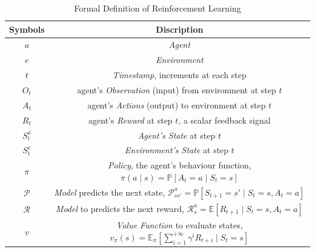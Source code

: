 \documentclass{llncs}
\begin{document}
\begin{table}[H]
\caption{Formal Definition of Reinforcement Learning\cite{David_Silver:intro_RL}}
\centering
\begin{tabular}{c c} %
\hline Symbols & Discription \\[0ex] \hline
$a$ & \emph{Agent}\\
$e$ & \emph{Environment}\\
$t$ & \emph{Timestamp}, increments at each step\\
$O_t$ & agent's \emph{Observation} (input) from environment at step $t$\\
$A_t$ & agent's \emph{Actions} (output) to environment at step $t$\\
$R_t$ & agent's \emph{Reward} at step $t$, a scalar feedback signal\\
$S_t^a$ & \emph{Agent's State} at step $t$\\
$S_t^e$ & \emph{Environment's State} at step $t$\\
$\pi$ & \emph{Policy}, the agent's behaviour function, $\pi(a \mid s)=\mathbb{P}[A_t=a \mid S_t = s]$\\
$\mathcal{P}$ & \emph{Model} predicts the next state, $\mathcal{P}_{ss'}^a =\mathbb{P}[S_{t+1}=s' \mid S_t=s, A_t=a]$\\
$\mathcal{R}$ & \emph{Model} to predicts the next reward, $\mathcal{R}_{s}^a =\mathbb{E}[R_{t+1} \mid S_t=s, A_t=a]$\\
$v$ & \emph{Value Function} to evaluate states, $v_\pi(s)=\mathbb{E}_\pi[\sum_{i=1}^{+\infty}\gamma^{i}R_{t+i}\mid S_t=s]$\\
\end{tabular}
\label{table:formal_definition_of_RL}
\end{table}
\end{document}
